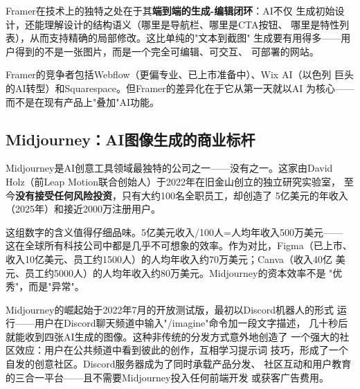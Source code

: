 Framer在技术上的独特之处在于其\textbf{端到端的生成-编辑闭环}：AI不仅
生成初始设计，还能理解设计的结构语义（哪里是导航栏、哪里是CTA按钮、
哪里是特性列表），从而支持精确的局部修改。这比单纯的"文本到截图"
生成要有用得多——用户得到的不是一张图片，而是一个完全可编辑、可交互、
可部署的网站。

Framer的竞争者包括Webflow（更偏专业、已上市准备中）、Wix AI（以色列
巨头的AI转型）和Squarespace。但Framer的差异化在于它从第一天就以AI
为核心——而不是在现有产品上"叠加"AI功能。

\subsection{Midjourney：AI图像生成的商业标杆}
\label{subsec:midjourney}

Midjourney是AI创意工具领域最独特的公司之一——没有之一。这家由David
Holz（前Leap Motion联合创始人）于2022年在旧金山创立的独立研究实验室，
至今\textbf{没有接受任何风险投资}，只有大约100名全职员工，却创造了
5亿美元的年收入（2025年）和接近2000万注册用户。

这组数字的含义值得仔细品味。5亿美元收入/100人=人均年收入500万美元——
这在全球所有科技公司中都是几乎不可想象的效率。作为对比，Figma（已上市、
收入10亿美元、员工约1500人）的人均年收入约70万美元；Canva（收入40亿
美元、员工约5000人）的人均年收入约80万美元。Midjourney的资本效率不是
"优秀"，而是"异常"。

Midjourney的崛起始于2022年7月的开放测试版，最初以Discord机器人的形式
运行——用户在Discord聊天频道中输入"/imagine"命令加一段文字描述，
几十秒后就能收到四张AI生成的图像。这种非传统的分发方式意外地创造了
一个强大的社区效应：用户在公共频道中看到彼此的创作，互相学习提示词
技巧，形成了一个自发的创意社区。Discord服务器成为了同时承载产品分发、
社区互动和用户教育的三合一平台——且不需要Midjourney投入任何前端开发
或获客广告费用。


